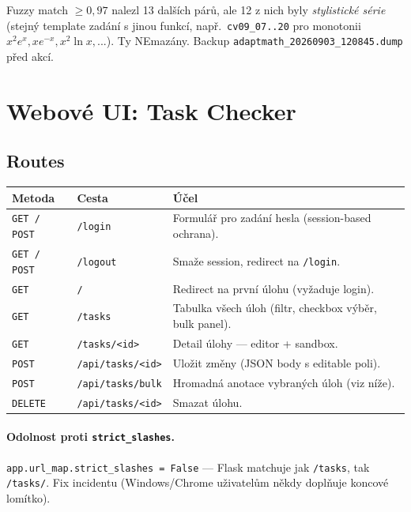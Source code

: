 \documentclass[11pt,a4paper]{article}
\begin{document}
Fuzzy match $\ge 0{,}97$ nalezl 13 dalších párů, ale 12 z nich byly \emph{stylistické série} (stejný template zadání s jinou funkcí, např.~\texttt{cv09\_07..20} pro monotonii $x^2 e^x, x e^{-x}, x^2 \ln x, ...$). Ty NEmazány. Backup \texttt{adaptmath\_20260903\_120845.dump} před akcí.

\section{Webové UI: Task Checker}

\subsection{Routes}

\begin{tabular}{lll}
  \toprule
  \textbf{Metoda} & \textbf{Cesta} & \textbf{Účel} \\
  \midrule
  \texttt{GET / POST} & \texttt{/login}           & Formulář pro zadání hesla (session-based ochrana). \\
  \texttt{GET / POST} & \texttt{/logout}          & Smaže session, redirect na \texttt{/login}. \\
  \texttt{GET}        & \texttt{/}                & Redirect na první úlohu (vyžaduje login). \\
  \texttt{GET}        & \texttt{/tasks}           & Tabulka všech úloh (filtr, checkbox výběr, bulk panel). \\
  \texttt{GET}        & \texttt{/tasks/<id>}      & Detail úlohy --- editor + sandbox. \\
  \texttt{POST}       & \texttt{/api/tasks/<id>}  & Uložit změny (JSON body s editable poli). \\
  \texttt{POST}       & \texttt{/api/tasks/bulk}  & Hromadná anotace vybraných úloh (viz níže). \\
  \texttt{DELETE}     & \texttt{/api/tasks/<id>}  & Smazat úlohu. \\
  \bottomrule
\end{tabular}

\paragraph{Odolnost proti \texttt{strict\_slashes}.} \texttt{app.url\_map.strict\_slashes = False} --- Flask matchuje jak \texttt{/tasks}, tak \texttt{/tasks/}. Fix incidentu (Windows/Chrome uživatelům někdy doplňuje koncové lomítko).
\end{document}
